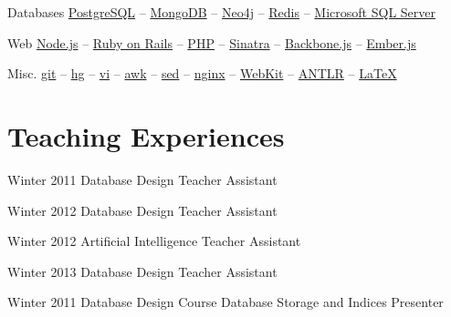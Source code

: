 \documentclass{tccv}
\begin{document}
{{\begin{factlist}
\item{Databases}
     {
     \href{http://www.postgresql.org}{PostgreSQL} -- 
     \href{http://www.mongodb.org}{MongoDB} -- 
     \href{http://www.neo4j.org}{Neo4j} -- 
     \href{http://redis.io}{Redis} -- 
     \href{http://www.microsoft.com/en-us/sqlserver/default.aspx}{Microsoft SQL Server}
     }

\item{Web}
     {
     \href{http://nodejs.org}{Node.js} -- 
     \href{http://rubyonrails.org}{Ruby on Rails} -- 
     \href{http://php.net}{PHP} -- 
     \href{http://www.sinatrarb.com}{Sinatra} -- 
     \href{http://backbonejs.org}{Backbone.js} -- 
     \href{http://emberjs.com}{Ember.js}
     }

\item{Misc.}
     {
     \href{http://git-scm.com}{git} -- 
     \href{http://www.selenic.com/mercurial/}{hg} -- 
     \href{http://www.vim.org}{vi} -- 
     \href{http://awk.info}{awk} -- 
     \href{http://www.gnu.org/software/sed/}{sed} -- 
     \href{http://nginx.org/en/}{nginx} -- 
     \href{http://www.webkit.org}{WebKit} -- 
     \href{http://www.antlr.org}{ANTLR} -- 
     \href{http://www.latex-project.org}{\LaTeX}
     }

\end{factlist}










\section{Teaching Experiences}

\begin{teaching}


\item{Winter 2011}
	 {}
	 {Database Design}
	 {Teacher Assistant}


\item{Winter 2012}
	 {}
	 {Database Design}
	 {Teacher Assistant}


\item{Winter 2012}
	 {}
	 {Artificial Intelligence}
	 {Teacher Assistant}


\item{Winter 2013}
	 {}
	 {Database Design}
	 {Teacher Assistant}



\item{Winter 2011}
	 {Database Design Course}
	 {Database Storage and Indices}
	 {Presenter}



\end{teaching}}}
\end{document}
